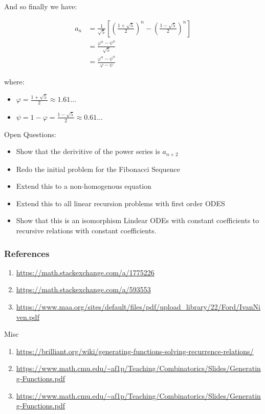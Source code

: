 \documentclass[11pt]{article}
\begin{document}
\begin{enumerate}
And so finally we have:


\begin{align*}
    a_n &= \frac{1}{\sqrt{5} } \left[ \left( \frac{1+  \sqrt{5} }{2}  \right)^n -  \left( \frac{1- \sqrt{5} }{2} \right)^n \right] \\
&= \frac{\varphi^n - \psi^n}{\sqrt{5} } \\
&= \frac{\varphi^n -  \psi^n}{\varphi - \psi}
\end{align*}


where:

\begin{itemize}
\item \(\varphi = \frac{1+ \sqrt{5} }{2} \approx 1.61\ldots\)
\item \(\psi = 1-\varphi = \frac{1- \sqrt{5} }{2} \approx 0.61\ldots\)
\end{itemize}

Open Questions:

\begin{itemize}
\item Show that the derivitive of the power series is \(a_{n+ 2}\)
\item Redo the initial problem for the Fibonacci Sequence
\item Extend this to a non-homogenous equation
\item Extend this to all linear recursion problems with first order ODES
\item Show that this is an isomorphism Lindear ODEs with constant
coefficients to recursive relations with constant coefficients.
\end{itemize}
\end{enumerate}

\subsubsection{References}
\label{sec:orgba0dc62}
\begin{enumerate}
\item \url{https://math.stackexchange.com/a/1775226}
\item \url{https://math.stackexchange.com/a/593553}
\item \url{https://www.maa.org/sites/default/files/pdf/upload\_library/22/Ford/IvanNiven.pdf}
\end{enumerate}

Misc

\begin{enumerate}
\item \url{https://brilliant.org/wiki/generating-functions-solving-recurrence-relations/}
\item \url{https://www.math.cmu.edu/\~af1p/Teaching/Combinatorics/Slides/Generating-Functions.pdf}
\item \url{https://www.math.cmu.edu/\~af1p/Teaching/Combinatorics/Slides/Generating-Functions.pdf}
\end{enumerate}
\end{document}
